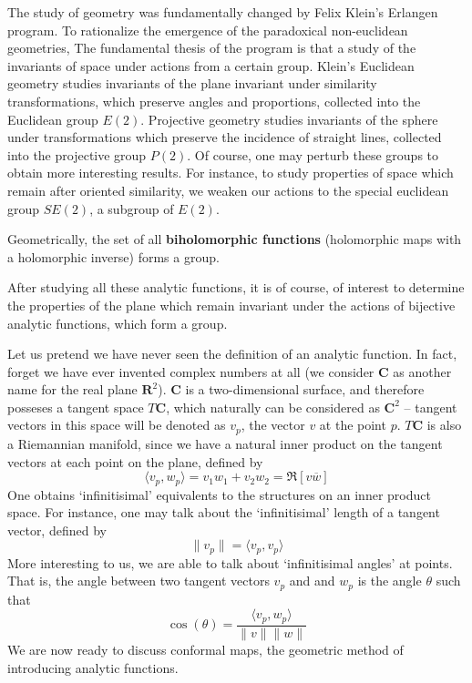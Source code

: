 The study of geometry was fundamentally changed by Felix Klein's Erlangen program. To rationalize the emergence of the paradoxical non-euclidean geometries, The fundamental thesis of the program is that a study of the invariants of space under actions from a certain group. Klein's Euclidean geometry studies invariants of the plane invariant under similarity transformations, which preserve angles and proportions, collected into the Euclidean group $E(2)$. Projective geometry studies invariants of the sphere under transformations which preserve the incidence of straight lines, collected into the projective group $P(2)$. Of course, one may perturb these groups to obtain more interesting results. For instance, to study properties of space which remain after oriented similarity, we weaken our actions to the special euclidean group $SE(2)$, a subgroup of $E(2)$.

Geometrically, the set of all {\bf biholomorphic functions} (holomorphic maps with a holomorphic inverse) forms a group.

After studying all these analytic functions, it is of course, of interest to determine the properties of the plane which remain invariant under the actions of bijective analytic functions, which form a group.

Let us pretend we have never seen the definition of an analytic function. In fact, forget we have ever invented complex numbers at all (we consider $\mathbf{C}$ as another name for the real plane $\mathbf{R}^2$). $\mathbf{C}$ is a two-dimensional surface, and therefore posseses a tangent space $T\mathbf{C}$, which naturally can be considered as $\mathbf{C}^2$ -- tangent vectors in this space will be denoted as $v_p$, the vector $v$ at the point $p$. $T\mathbf{C}$ is also a Riemannian manifold, since we have a natural inner product on the tangent vectors at each point on the plane, defined by
%
\[ \langle v_p, w_p \rangle = v_1 w_1 + v_2 w_2 = \Re[v\overline{w}] \]
%
One obtains `infinitisimal' equivalents to the structures on an inner product space. For instance, one may talk about the `infinitisimal' length of a tangent vector, defined by
%
\[ \| v_p \| = \langle v_p, v_p \rangle \]
%
More interesting to us, we are able to talk about `infinitisimal angles' at points. That is, the angle between two tangent vectors $v_p$ and and $w_p$ is the angle $\theta$ such that
%
\[ \cos(\theta) = \frac{\langle v_p, w_p \rangle}{\|v\| \|w\|} \]
%
We are now ready to discuss conformal maps, the geometric method of introducing analytic functions.

